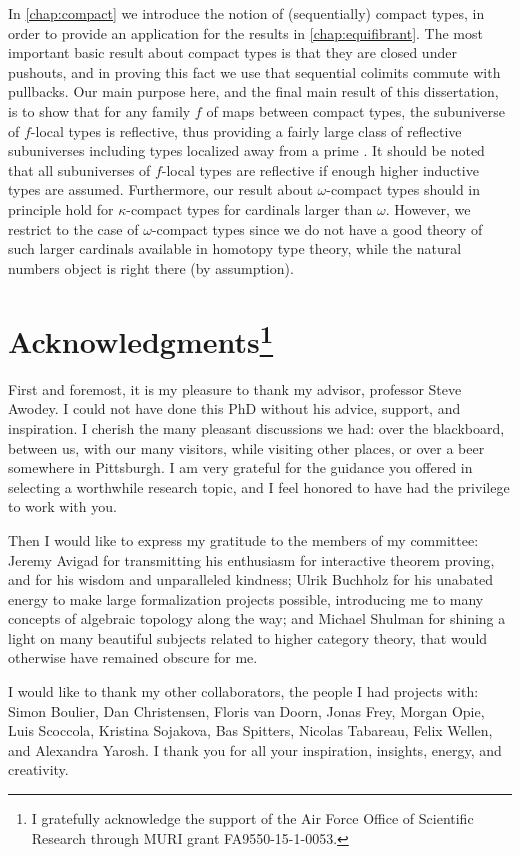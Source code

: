 In \cref{chap:compact} we introduce the notion of (sequentially) compact types, in order to provide an application for the results in \cref{chap:equifibrant}. The most important basic result about compact types is that they are closed under pushouts, and in proving this fact we use that sequential colimits commute with pullbacks.
Our main purpose here, and the final main result of this dissertation, is to show that for any family $f$ of maps between compact types, the subuniverse of $f$-local types is reflective, thus providing a fairly large class of reflective subuniverses including types localized away from a prime \cite{ChristensenOpieRijkeScoccola}. It should be noted that all subuniverses of $f$-local types are reflective if enough higher inductive types are assumed. Furthermore, our result about $\omega$-compact types should in principle hold for $\kappa$-compact types for cardinals larger than $\omega$. However, we restrict to the case of $\omega$-compact types since we do not have a good theory of such larger cardinals available in homotopy type theory, while the natural numbers object is right there (by assumption).

\section{Acknowledgments\footnote{I gratefully acknowledge the support of the Air Force Office of Scientific Research through MURI grant FA9550-15-1-0053.}}
First and foremost, it is my pleasure to thank my advisor, professor Steve Awodey. I could not have done this PhD without his advice, support, and inspiration. I cherish the many pleasant discussions we had: over the blackboard, between us, with our many visitors, while visiting other places, or over a beer somewhere in Pittsburgh. I am very grateful for the guidance you offered in selecting a worthwhile research topic, and I feel honored to have had the privilege to work with you.

Then I would like to express my gratitude to the members of my committee: Jeremy Avigad for transmitting his enthusiasm for interactive theorem proving, and for his wisdom and unparalleled kindness; Ulrik Buchholz for his unabated energy to make large formalization projects possible, introducing me to many concepts of algebraic topology along the way; and Michael Shulman for shining a light on many beautiful subjects related to higher category theory, that would otherwise have remained obscure for me.

I would like to thank my other collaborators, the people I had projects with:
Simon Boulier, Dan Christensen, Floris van Doorn, Jonas Frey, Morgan Opie, Luis Scoccola, Kristina Sojakova, Bas Spitters, Nicolas Tabareau, Felix Wellen, and Alexandra Yarosh. I thank you for all your inspiration, insights, energy, and creativity.

